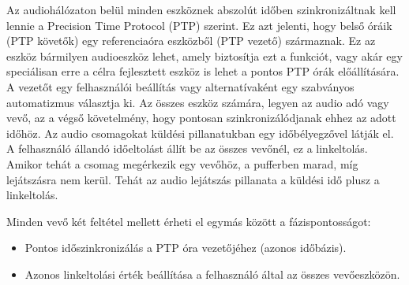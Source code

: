 Az audiohálózaton belül minden eszköznek abszolút időben szinkronizáltnak kell lennie
a Precision Time Protocol (PTP) szerint. Ez azt jelenti, hogy belső óráik (PTP
követők) egy referenciaóra eszközből (PTP vezető) származnak. Ez az eszköz
bármilyen audioeszköz lehet, amely biztosítja ezt a funkciót, vagy akár egy
speciálisan erre a célra fejlesztett eszköz is lehet a pontos PTP órák előállítására.
A vezetőt egy felhasználói beállítás vagy alternatívaként egy szabványos
automatizmus választja ki. Az összes eszköz számára, legyen az audio adó vagy
vevő, az a végső követelmény, hogy pontosan szinkronizálódjanak ehhez az adott időhöz.
Az audio csomagokat küldési pillanatukban egy időbélyegzővel látják el. A felhasználó állandó időeltolást állít be az
összes vevőnél, ez a linkeltolás. Amikor tehát a csomag megérkezik egy vevőhöz, a
pufferben marad, míg lejátszásra nem kerül. Tehát az audio lejátszás pillanata a
küldési idő plusz a linkeltolás. \newline

Minden vevő két feltétel mellett érheti el egymás között a fázispontosságot:
\begin{itemize}
	\item Pontos időszinkronizálás a PTP óra vezetőjéhez (azonos időbázis).
	\item Azonos linkeltolási érték beállítása a felhasználó által az összes vevőeszközön.
\end{itemize}

